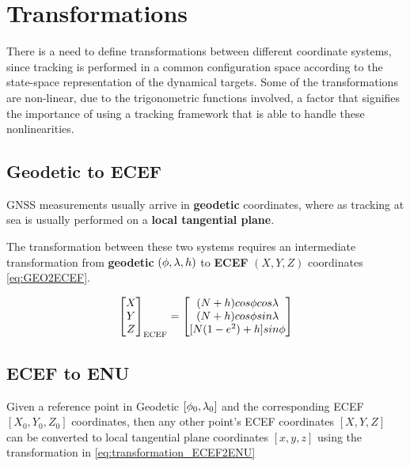 \section{Transformations}\label{sec:transformations}

There is a need to define transformations between different coordinate systems, since tracking is performed in a common configuration space according to the state-space representation of the dynamical targets. Some of the transformations are non-linear, due to the trigonometric functions involved, a factor that signifies the importance of using a tracking framework that is able to handle these nonlinearities.

\subsection{Geodetic to ECEF}

GNSS measurements usually arrive in  \textbf{geodetic} coordinates, where as tracking at sea is usually performed on a \textbf{local tangential plane}.


The transformation between these two systems requires an intermediate transformation from \textbf{geodetic} $(\phi,{\lambda},h)$ to \textbf{ECEF}   $(X,Y,Z)$ coordinates \ref{eq:GEO2ECEF}.

\begin{equation} \label{eq:GEO2ECEF}
	\begin{bmatrix}
	X\\
	Y\\
	Z
	\end{bmatrix}_{\text{ECEF}} =
	\begin{bmatrix}
	(N+h)cos{\phi} cos{\lambda} \\
	(N+h)cos{\phi} sin{\lambda} \\
	[N(1-e^2)+h] sin{\phi}
	\end{bmatrix}
\end{equation}


\subsection{ECEF to ENU}



Given a reference point in Geodetic $[{\phi}_0,{\lambda}_0]$ and the corresponding ECEF $[X_0,Y_0,Z_0]$ coordinates, then any other point's ECEF coordinates $[X,Y,Z]$ can be converted to local tangential plane coordinates $[x,y,z]$ using the transformation in \ref{eq:transformation_ECEF2ENU}



